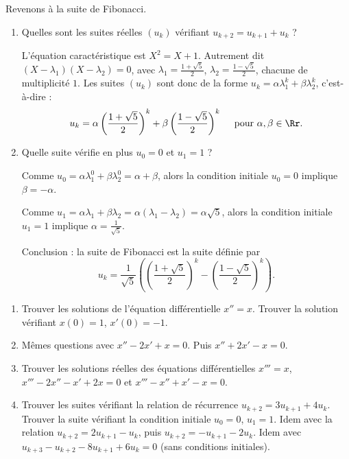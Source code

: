 \documentclass[12pt, class=report,crop=false]{standalone}
\begin{document}
Revenons à la suite de Fibonacci.
\begin{exemple}
\sauteligne
\begin{enumerate}
  \item Quelles sont les suites réelles $(u_k)$ vérifiant $u_{k+2} = u_{k+1}+u_{k}$ ?
    
  L'équation caractéristique est $X^2 = X + 1$. Autrement dit $(X-\lambda_1)(X-\lambda_2)=0$,
  avec $\lambda_1 = \frac{1+\sqrt5}{2}$, $\lambda_2 = \frac{1-\sqrt5}{2}$, chacune de multiplicité $1$.
  Les suites $(u_k)$ sont donc de la forme $u_k = \alpha \lambda_1^k + \beta \lambda_2^k$, c'est-à-dire :
  $$u_k = \alpha \left(\frac{1+\sqrt5}{2}\right)^k + \beta \left(\frac{1-\sqrt5}{2}\right)^k \quad \text{ pour } \alpha, \beta \in \Rr.$$
  
  \item Quelle suite vérifie en plus $u_0 = 0$ et $u_1= 1$ ?
  
  Comme $u_0 = \alpha \lambda_1^0 + \beta \lambda_2^0 = \alpha+\beta$, alors la condition initiale $u_0 = 0$ implique
  $\beta = -\alpha$.
  
  Comme $u_1 = \alpha \lambda_1 + \beta \lambda_2 = \alpha(\lambda_1-\lambda_2) = \alpha \sqrt5$, alors la condition initiale $u_1 = 1$ implique $\alpha = \frac{1}{\sqrt5}$.
  
  Conclusion : la suite de Fibonacci est la suite définie par
  $$u_k =  \frac{1}{\sqrt5}\left( \left(\frac{1+\sqrt5}{2}\right)^k - \left(\frac{1-\sqrt5}{2}\right)^k\right).$$
  
\end{enumerate}
\end{exemple}

\begin{miniexercices}
\sauteligne
\begin{enumerate}
  \item Trouver les solutions de l'équation différentielle $x''=x$.
  Trouver la solution vérifiant $x(0) = 1$, $x'(0)=-1$.
  
  \item Mêmes questions avec $x''-2x'+x=0$.
  Puis $x''+2x'-x=0$.
  
  \item Trouver les solutions réelles des équations différentielles 
  $x''' = x$, $x''' - 2x'' - x' + 2x=0$ et
  $x''' - x'' + x' - x=0$.
  
  \item Trouver les suites vérifiant la relation de récurrence $u_{k+2} = 3u_{k+1}+4u_k$. Trouver la suite vérifiant la condition initiale $u_0=0$, $u_1 = 1$. Idem avec la relation  $u_{k+2} = 2u_{k+1}-u_k$, puis
 $u_{k+2} = -u_{k+1}-2u_k$. 
  Idem avec $u_{k+3} - u_{k+2} -8u_{k+1} + 6u_k = 0$ (sans conditions initiales).  
  
\end{enumerate}
\end{miniexercices}
\end{document}
